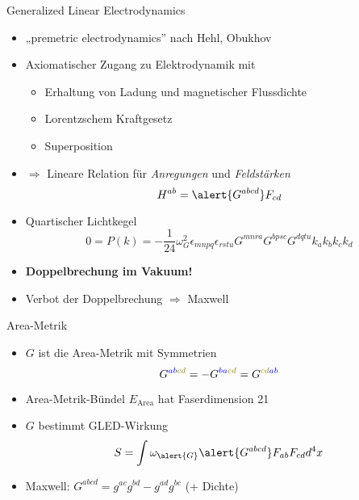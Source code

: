 \documentclass{beamer}
\begin{document}
    \begin{frame}{Generalized Linear Electrodynamics}
        \begin{itemize}
            \item „premetric electrodynamics” nach Hehl, Obukhov
            \item Axiomatischer Zugang zu Elektrodynamik mit
            \begin{itemize}
                \item Erhaltung von Ladung und magnetischer Flussdichte
                \item Lorentzschem Kraftgesetz
                \item Superposition
            \end{itemize}
            \item $\Rightarrow$ Lineare Relation für \textit{Anregungen} und \textit{Feldstärken}
            \[
                H^{ab} = \alert{G^{abcd}} F_{cd}
            \]
            \item Quartischer Lichtkegel \[ 0 = P(k) = -\frac{1}{24} \omega_G^2 \epsilon_{mnpq} \epsilon_{rstu} G^{mnra} G^{bpsc} G^{dqtu} k_a k_b k_c k_d \]
            \item \textbf{Doppelbrechung im Vakuum!}
            \item Verbot der Doppelbrechung $\Rightarrow$ Maxwell
        \end{itemize}
    \end{frame}

    \begin{frame}{Area-Metrik}
        \begin{itemize}
            \item \alert{$G$} ist die \alert{Area-Metrik} mit Symmetrien
            \[ G^{\color{blue}ab\color{olive}cd} = -G^{\color{blue}ba\color{olive}cd} = G^{\color{olive}cd\color{blue}ab} \]
            \item Area-Metrik-Bündel $E_\text{Area}$ hat Faserdimension 21
            \item $G$ bestimmt GLED-Wirkung \[ S = \int \omega_{\alert{G}} \alert{G^{abcd}} F_{ab} F_{cd} d^4 x \]
            \item Maxwell: $G^{abcd} = g^{ac} g^{bd} - g^{ad} g^{bc}$ (+ Dichte)
        \end{itemize}
    \end{frame}
\end{document}
